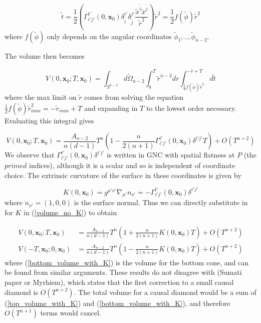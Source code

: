 \documentclass[12pt]{article}
\newcommand{\be}{\begin{equation}}
\newcommand{\ee}{\end{equation}}
\begin{document}
\be\label{RNC_surface_in_r}
\tilde{t}=\frac{1}{2}\left(\Gamma^{t'}_{i'j'}(0,\mathbf{x}_0)\delta^{i'}_{\tilde{i}}
\delta^{j'}_{\tilde{j}}
\frac{\tilde{x}^{\tilde{i}}
\tilde{x}^{\tilde{j}}}{{\tilde{r}}^2}\right)
{\tilde{r}}^2
=\frac{1}{2}f(\tilde{\phi}){\tilde{r}}^2
\ee
where $f(\tilde{\phi})$ only depends on the angular coordinates $\tilde{\phi}_1,..,\tilde{\phi}_{n-2}$.

The volume then becomes

\be\label{volume_with_approx}
V(0,\mathbf{x}_0;T,\mathbf{x}_0)=\int_{S^{n-2}}
d\tilde{\Omega}_{n-2}
\int_{0}^{T}\tilde{r}^{n-2}dr
\int_{\frac{1}{2}f(\tilde{\phi})\tilde{r}^2}^{-\tilde{r}+T}
d\tilde{t}
\ee
where the max limit on $\tilde{r}$ comes from solving the equation $\frac{1}{2}f(\tilde{\phi})\tilde{r}^2_{max}=
-\tilde{r}_{max}+T$ and expanding in $T$ to the lowest order necessary. Evaluating this integral gives

\be\label{volume_no_K}
V(0,\mathbf{x}_0;T,\mathbf{x}_0)
=\frac{A_{n-2}}{n(d-1)}T^n\left(1-\frac{n}{2(n+1)}\Gamma^{t'}_{i'j'}(0,\mathbf{x}_0)\delta^{i'j'}T\right)
+O(T^{n+2})
\ee
We observe that $\Gamma^{t'}_{i'j'}(0,\mathbf{x}_0)\delta^{i'j'}$ is written in GNC with spatial flatness at $P$ (the $primed$ indices), although it is a scalar and so is independent of coordinate choice. The extrinsic curvature of the surface in these coordinates is given by

\be\label{K_eqn}
K(0,\mathbf{x}_0)
=g^{\mu '\nu '}\nabla_{\mu '}n_{\nu '}
=-\Gamma^{t'}_{i'j'}(0,\mathbf{x}_0)\delta^{i'j'}
\ee
where $n_{\nu '}=(1,0,0)$ is the surface normal. Thus we can directly substitute in for $K$ in (\ref{volume_no_K}) to obtain

\begin{align}
V(0,\mathbf{x}_0;T,\mathbf{x}_0)
&=\frac{A_{n-2}}{n(d-1)}T^n\left(1+\frac{n}{2(n+1)}K(0,\mathbf{x}_0)T\right)
+O(T^{n+2}) \label{top_volume_with_K}\\
V(-T,\mathbf{x}_0;0,\mathbf{x}_0)
&=\frac{A_{n-2}}{n(d-1)}T^n\left(1-\frac{n}{2(n+1)}K(0,\mathbf{x}_0)T\right)
+O(T^{n+2}) \label{bottom_volume_with_K}
\end{align}
where (\ref{bottom_volume_with_K}) is the volume for the bottom cone, and can be found from similar arguments. These results do not disagree with (Sumati paper or Myrhiem), which states that the first correction to a small causal diamond is $O(T^{n+2})$. The total volume for a causal diamond would be a sum of (\ref{top_volume_with_K}) and (\ref{bottom_volume_with_K}), and therefore $O(T^{n+1})$ terms would cancel.
\end{document}
